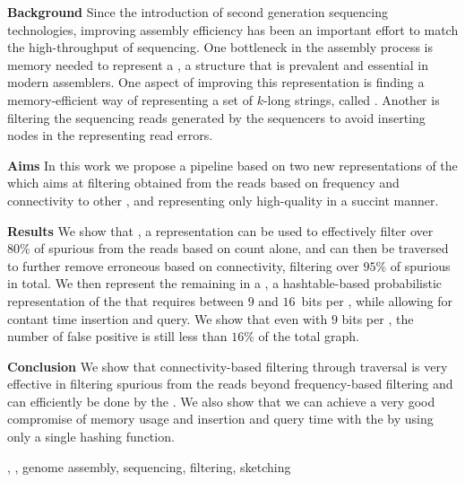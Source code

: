 \abstract

\textbf{Background} Since the introduction of second generation sequencing technologies, improving assembly efficiency has been an important effort to match the high-throughput of sequencing. One bottleneck in the assembly process is memory needed to represent a \dBG, a structure that is prevalent and essential in modern assemblers. One aspect of improving this representation is finding a memory-efficient way of representing a set of $k$-long strings, called \kmers. Another is filtering the sequencing reads generated by the sequencers to avoid inserting nodes in the \dBG representing read errors.

\textbf{Aims} In this work we propose a pipeline based on two new representations of the \dBG which aims at filtering  obtained from the reads based on frequency and connectivity to other , and representing only high-quality  in a succint manner.

\textbf{Results} We show that \dBCM, a  representation can be used to effectively filter over $80\%$ of spurious  from the reads based on count alone, and can then be traversed to further remove erroneous  based on connectivity, filtering over $95\%$ of spurious  in total. We then represent the remaining  in a \dBHT, a hashtable-based probabilistic representation of the \dBG that requires between $9$ and $16$~bits per \kmer, while allowing for contant time insertion and query. We show that even with $9$ bits per \kmer, the number of false positive  is still less than $16\%$ of the total graph.

\textbf{Conclusion} We show that connectivity-based filtering through traversal is very effective in filtering spurious  from the reads beyond frequency-based filtering and can efficiently be done by the \dBCM. We also show that we can achieve a very good compromise of memory usage and insertion and query time with the \dBHT by using only a single hashing function.

\begin{keywords}
\dBG, \kmer, genome assembly, sequencing, filtering, sketching
\end{keywords}